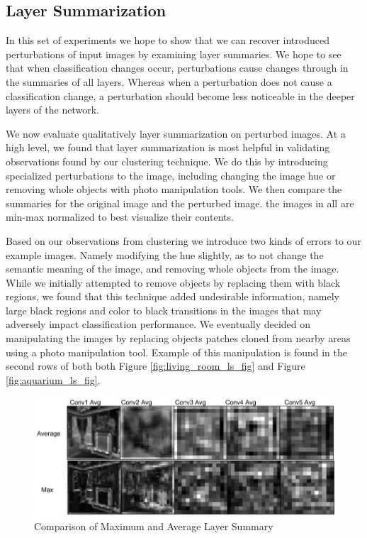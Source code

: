 \subsection{Layer Summarization}
\label{sec:exp_layer_summaries}

In this set of experiments we hope to show that we can recover introduced perturbations of input images by examining layer summaries. We hope to see that when classification changes occur, perturbations cause changes through in the summaries of all layers. Whereas when a perturbation does not cause a classification change, a perturbation should become less noticeable in the deeper layers of the network.

We now evaluate qualitatively layer summarization on perturbed images. At a high level, we found that layer summarization is most helpful in validating observations found by our clustering technique. We do this by introducing specialized perturbations to the image, including changing the image hue or removing whole objects with photo manipulation tools. We then compare the summaries for the original image and the perturbed image. the images in all are min-max normalized to best visualize their contents.

Based on our observations from clustering we introduce two kinds of errors to our example images. Namely modifying the hue slightly, as to not change the semantic meaning of the image, and removing whole objects from the image. While we initially attempted to remove objects by replacing them with black regions, we found that this technique added undesirable information, namely large black regions and color to black transitions in the images that may adversely impact classification performance. We eventually decided on manipulating the images by replacing objects patches cloned from nearby areas using a photo manipulation tool. Example of this manipulation is found in the second rows of both both Figure \ref{fig:living_room_ls_fig} and Figure \ref{fig:aquarium_ls_fig}. 

\begin{figure}[tbp]
\centering
\includegraphics[width=\columnwidth]{figures/layer_summary/avg_vs_max_layer_summary}
\caption{Comparison of Maximum and Average Layer Summary}

\label{fig:avg_vs_max_fig}
\end{figure}

